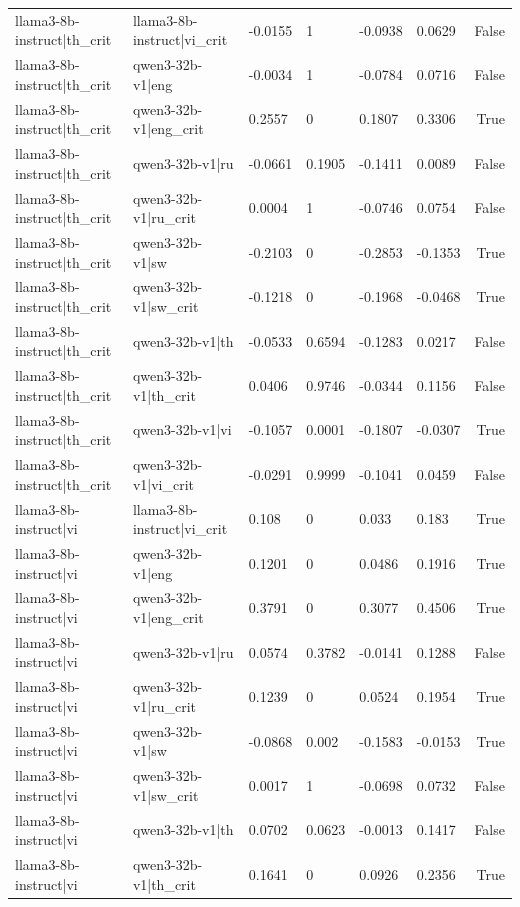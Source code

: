 \begin{table}
\begin{tabular}{llllllr}
llama3-8b-instruct|th_crit & llama3-8b-instruct|vi_crit & -0.0155 & 1 & -0.0938 & 0.0629 & False \\
llama3-8b-instruct|th_crit & qwen3-32b-v1|eng & -0.0034 & 1 & -0.0784 & 0.0716 & False \\
llama3-8b-instruct|th_crit & qwen3-32b-v1|eng_crit & 0.2557 & 0 & 0.1807 & 0.3306 & True \\
llama3-8b-instruct|th_crit & qwen3-32b-v1|ru & -0.0661 & 0.1905 & -0.1411 & 0.0089 & False \\
llama3-8b-instruct|th_crit & qwen3-32b-v1|ru_crit & 0.0004 & 1 & -0.0746 & 0.0754 & False \\
llama3-8b-instruct|th_crit & qwen3-32b-v1|sw & -0.2103 & 0 & -0.2853 & -0.1353 & True \\
llama3-8b-instruct|th_crit & qwen3-32b-v1|sw_crit & -0.1218 & 0 & -0.1968 & -0.0468 & True \\
llama3-8b-instruct|th_crit & qwen3-32b-v1|th & -0.0533 & 0.6594 & -0.1283 & 0.0217 & False \\
llama3-8b-instruct|th_crit & qwen3-32b-v1|th_crit & 0.0406 & 0.9746 & -0.0344 & 0.1156 & False \\
llama3-8b-instruct|th_crit & qwen3-32b-v1|vi & -0.1057 & 0.0001 & -0.1807 & -0.0307 & True \\
llama3-8b-instruct|th_crit & qwen3-32b-v1|vi_crit & -0.0291 & 0.9999 & -0.1041 & 0.0459 & False \\
llama3-8b-instruct|vi & llama3-8b-instruct|vi_crit & 0.108 & 0 & 0.033 & 0.183 & True \\
llama3-8b-instruct|vi & qwen3-32b-v1|eng & 0.1201 & 0 & 0.0486 & 0.1916 & True \\
llama3-8b-instruct|vi & qwen3-32b-v1|eng_crit & 0.3791 & 0 & 0.3077 & 0.4506 & True \\
llama3-8b-instruct|vi & qwen3-32b-v1|ru & 0.0574 & 0.3782 & -0.0141 & 0.1288 & False \\
llama3-8b-instruct|vi & qwen3-32b-v1|ru_crit & 0.1239 & 0 & 0.0524 & 0.1954 & True \\
llama3-8b-instruct|vi & qwen3-32b-v1|sw & -0.0868 & 0.002 & -0.1583 & -0.0153 & True \\
llama3-8b-instruct|vi & qwen3-32b-v1|sw_crit & 0.0017 & 1 & -0.0698 & 0.0732 & False \\
llama3-8b-instruct|vi & qwen3-32b-v1|th & 0.0702 & 0.0623 & -0.0013 & 0.1417 & False \\
llama3-8b-instruct|vi & qwen3-32b-v1|th_crit & 0.1641 & 0 & 0.0926 & 0.2356 & True \\

\end{tabular}
\end{table}
